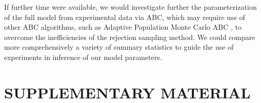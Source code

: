 \documentclass[twocolumn]{biophys}
\newlength\tindent
\renewcommand{\indent}{\hspace*{\tindent}}
\begin{document}
\indent If further time were available, we would investigate further the parameterization of the full model from experimental data via ABC, which may require use of other ABC algorithms, such as Adaptive Population Monte Carlo ABC \citep{lenormand2013adaptive}, to overcome the inefficiencies of the rejection sampling method.
We could compare more comprehensively a variety of summary statistics to guide the use of experiments in inference of our model parameters.

\section*{SUPPLEMENTARY MATERIAL}


\vspace{1cm}
{}

\appendix
\end{document}
